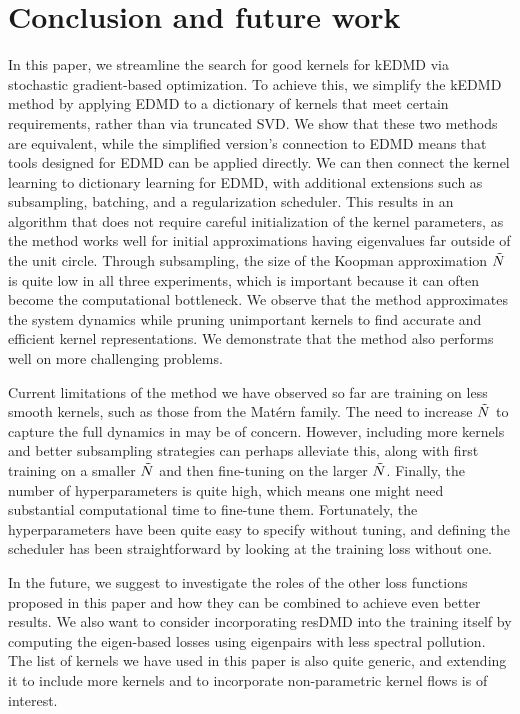 \documentclass{article}
\begin{document}
\section{Conclusion and future work}\label{sec:conclusion}
In this paper, we streamline the search for good kernels for kEDMD via stochastic gradient-based optimization. To achieve this, we simplify the kEDMD method by applying EDMD to a dictionary of kernels that meet certain requirements, rather than via truncated SVD. We show that these two methods are equivalent, while the simplified version's connection to EDMD means that tools designed for EDMD can be applied directly. We can then connect the kernel learning to dictionary learning for EDMD, with additional extensions such as subsampling, batching, and a regularization scheduler. This results in an algorithm that does not require careful initialization of the kernel parameters, as the method works well for initial approximations having eigenvalues far outside of the unit circle. Through subsampling, the size of the Koopman approximation \(\Tilde N\) is quite low in all three experiments, which is important because it can often become the computational bottleneck. We observe that the method approximates the system dynamics while pruning unimportant kernels to find accurate and efficient kernel representations. We demonstrate that the method also performs well on more challenging problems.

Current limitations of the method we have observed so far are training on less smooth kernels, such as those from the Matérn family. The need to increase \(\Tilde N\) to capture the full dynamics in  may be of concern. However, including more kernels and better subsampling strategies can perhaps alleviate this, along with first training on a smaller \(\Tilde N\) and then fine-tuning on the larger \(\Tilde N\). Finally, the number of hyperparameters is quite high, which means one might need substantial computational time to fine-tune them. Fortunately, the hyperparameters have been quite easy to specify without tuning, and defining the scheduler has been straightforward by looking at the training loss without one. 

In the future, we suggest to investigate the roles of the other loss functions proposed in this paper and how they can be combined to achieve even better results. We also want to consider incorporating resDMD into the training itself by computing the eigen-based losses using eigenpairs with less spectral pollution. The list of kernels we have used in this paper is also quite generic, and extending it to include more kernels and to incorporate non-parametric kernel flows is of interest.
\end{document}
